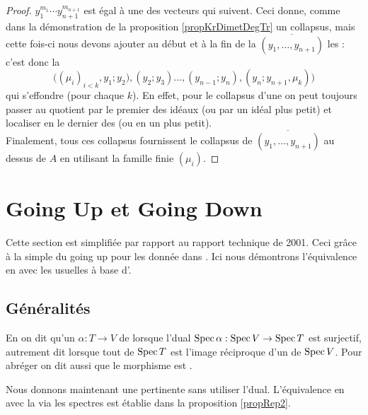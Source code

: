 \begin{proof}
$y_1^{m_1}\cdots y_{n+1}^{m_{n+1}}$ est égal à une \coli des vecteurs 
qui suivent.
Ceci donne, comme dans la démonstration de
la proposition \ref{propKrDimetDegTr} un collapsus, mais cette fois-ci
nous devons ajouter au début et à la fin de la \proel 
$\overline{(y_1,\ldots,y_{n+1})}$ les :
c'est donc la \proc 
$$
\big((\mu_i)_{i<k},y_1;y_2),(y_2;y_3)\ldots,
      (y_{n-1};y_{n}),(y_{n};y_{n+1},\mu_k)\big)
$$ 
qui s'effondre (pour chaque $k$). En effet, pour le collapsus
d'une \proc on peut toujours passer au quotient par le premier 
des idéaux (ou par un idéal plus petit) et localiser en 
le dernier des \mos (ou en un \mo plus petit).\\
Finalement, tous ces collapsus fournissent le collapsus de 
$\overline{(y_1,\ldots,y_{n+1})}$ au dessus de
$A$ en utilisant la famille finie $(\mu_i)$.
\end{proof}


\section{Going Up et Going Down} 
\label{secGUGD}

Cette section est simplifiée par rapport au rapport technique de 2001.
Ceci grâce à la \dfn simple du going up pour les \trdis donnée dans \cite{ACMC}. Ici nous démontrons l'équivalence en \clama avec les \dfns usuelles à base d'\ideps.
\subsection{Généralités}\label{secGUpTrdi} 


En \clama on dit qu'un \homo $\alpha: T\to V$ de \trdis {} lorsque l'\homo dual \hbox{${\rm Spec}\,\alpha:{\rm Spec} \,V\to{\rm Spec}\, T$} est surjectif, autrement dit lorsque tout \idep de ${\rm Spec}\, T$
est l'image réciproque d'un \idep de ${\rm Spec}\, V$. Pour abréger on dit
aussi que le morphisme est .

Nous donnons maintenant une \dfn \cot pertinente sans utiliser l'\homo dual. L'équivalence en \clama avec la \dfn via les spectres
est établie dans la proposition \ref{propRep2}.

